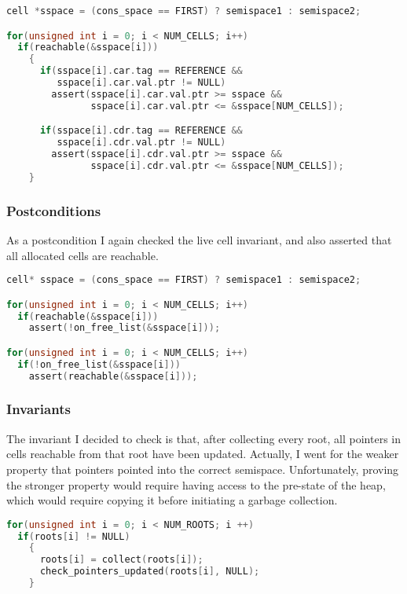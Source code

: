 \begin{lstlisting}[language=C,caption={Fenichel/Yochelson Preconditions}]
cell *sspace = (cons_space == FIRST) ? semispace1 : semispace2;

for(unsigned int i = 0; i < NUM_CELLS; i++)
  if(reachable(&sspace[i]))
    {
      if(sspace[i].car.tag == REFERENCE &&
         sspace[i].car.val.ptr != NULL)
        assert(sspace[i].car.val.ptr >= sspace &&
               sspace[i].car.val.ptr <= &sspace[NUM_CELLS]);

      if(sspace[i].cdr.tag == REFERENCE &&
         sspace[i].cdr.val.ptr != NULL)
        assert(sspace[i].cdr.val.ptr >= sspace &&
               sspace[i].cdr.val.ptr <= &sspace[NUM_CELLS]);
    }
\end{lstlisting}

\subsubsection{Postconditions}
\label{sec:results-impl-c-post}

As a postcondition I again checked the live cell invariant, and also
asserted that all allocated cells are reachable.

\begin{lstlisting}[language=C,caption={Fenichel/Yochelson Postconditions}]
cell* sspace = (cons_space == FIRST) ? semispace1 : semispace2;

for(unsigned int i = 0; i < NUM_CELLS; i++)
  if(reachable(&sspace[i]))
    assert(!on_free_list(&sspace[i]));

for(unsigned int i = 0; i < NUM_CELLS; i++)
  if(!on_free_list(&sspace[i]))
    assert(reachable(&sspace[i]));
\end{lstlisting}

\subsubsection{Invariants}
\label{sec:results-impl-c-invariants}

The invariant I decided to check is that, after collecting every root,
all pointers in cells reachable from that root have been
updated. Actually, I went for the weaker property that pointers
pointed into the correct semispace. Unfortunately, proving the
stronger property would require having access to the pre-state of the
heap, which would require copying it before initiating a garbage
collection.

\begin{lstlisting}[language=C,caption={Fenichel/Yochelson GC Loop}]
for(unsigned int i = 0; i < NUM_ROOTS; i ++)
  if(roots[i] != NULL)
    {
      roots[i] = collect(roots[i]);
      check_pointers_updated(roots[i], NULL);
    }
\end{lstlisting}

